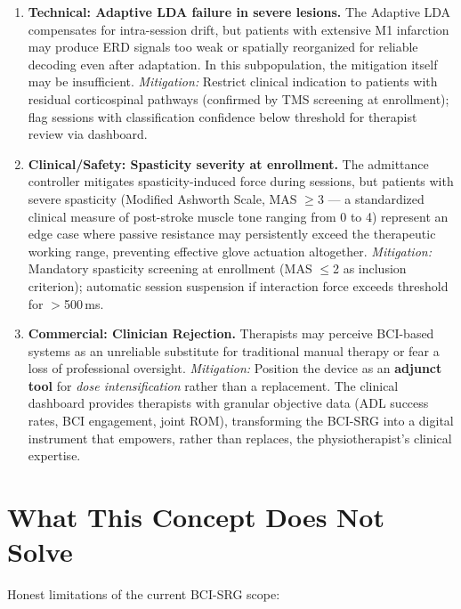 \documentclass[11pt,a4paper]{article}
\begin{document}
\begin{enumerate}
    \item \textbf{Technical: Adaptive LDA failure in severe lesions.} 
    The Adaptive LDA compensates for intra-session drift, but patients 
    with extensive M1 infarction may produce ERD signals too weak or 
    spatially reorganized for reliable decoding even after adaptation. 
    In this subpopulation, the mitigation itself may be insufficient. 
    \textit{Mitigation:} Restrict clinical indication to patients with 
    residual corticospinal pathways (confirmed by TMS screening at 
    enrollment); flag sessions with classification confidence below 
    threshold for therapist review via dashboard.
    \item \textbf{Clinical/Safety: Spasticity severity at enrollment.} 
    The admittance controller mitigates spasticity-induced force during 
    sessions, but patients with severe spasticity (Modified Ashworth 
    Scale, MAS $\geq$3 --- a standardized clinical measure of 
    post-stroke muscle tone ranging from 0 to 4) represent an edge 
    case where passive resistance may persistently exceed the 
    therapeutic working range, preventing effective glove actuation 
    altogether. \textit{Mitigation:} Mandatory spasticity screening 
    at enrollment (MAS $\leq$2 as inclusion criterion); automatic 
    session suspension if interaction force exceeds threshold for 
    $>$500\,ms.
    \item \textbf{Commercial: Clinician Rejection.} Therapists may perceive BCI-based systems as an unreliable substitute for traditional manual therapy or fear a loss of professional oversight. 
    \textit{Mitigation:} Position the device as an \textbf{adjunct tool} for \textit{dose intensification} rather than a replacement. The clinical dashboard provides therapists with granular objective data (ADL success rates, BCI engagement, joint ROM), transforming the BCI-SRG into a digital instrument that empowers, rather than replaces, the physiotherapist’s clinical expertise.
\end{enumerate}

\section{What This Concept Does Not Solve}

Honest limitations of the current BCI-SRG scope:
\end{document}
